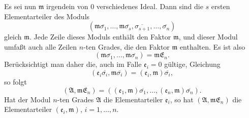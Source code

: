 \documentclass[11pt]{article}
\begin{document}
Es sei nun $\mathfrak m$ irgendein von $0$ verschiedenes Ideal. Dann sind die $s$ ersten Elementarteiler des Moduls
\[
(\mathfrak m\overline{\sigma_1},
\ldots,
\mathfrak m\overline{\sigma_s},
\overline{\sigma_{s+1}},
\ldots,
\overline{\sigma_n})
\]
gleich $\mathfrak m$. Jede Zeile dieses Moduls enthält den Faktor $\mathfrak m$, und dieser Modul umfaßt auch alle Zeilen $n$-ten Grades, die den Faktor $\mathfrak m$ enthalten. Es ist also
\[
(\mathfrak m\overline{\sigma_1},
\ldots,
\mathfrak m\overline{\sigma_n})=\mathfrak m\mathfrak E_n.
\]
Berücksichtigt man daher die, auch im Falle $\mathfrak e_i=0$ gültige, Gleichung
\[
(\mathfrak e_i\overline{\sigma_i},
\mathfrak m\overline{\sigma_i})=(\mathfrak e_i,
\mathfrak m)\overline{\sigma_i},
\]
so folgt
\[
(\mathfrak A,
\mathfrak m\mathfrak E_n)=((\mathfrak e_1,
\mathfrak m)\overline{\sigma_1},
\ldots,
(\mathfrak e_n,
\mathfrak m)\overline{\sigma_n}).
\]
Hat der Modul $n$-ten Grades $\mathfrak A$ die Elementarteiler $\mathfrak e_i$, so hat $(\mathfrak A,
\mathfrak m\mathfrak E_n)$ die Elementarteiler $(\mathfrak e_i,
\mathfrak m)$, $i=1,
\ldots,n$.
\end{document}
